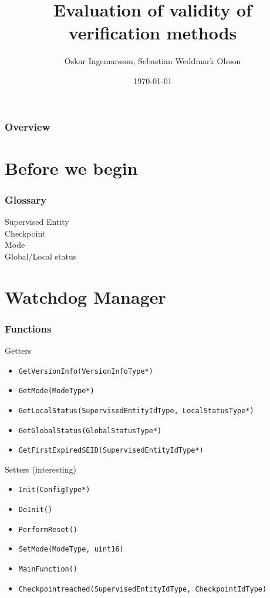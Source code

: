 \documentclass{beamer}
\title{Evaluation of validity of verification methods}
\author{Oskar Ingemarsson, Sebastian Weddmark Olsson}
\institute{Chalmers University of Technology, Mecel AB}
\date{\today}
\begin{document}
\begin{frame}
  \titlepage
\end{frame}

\begin{frame}
  \frametitle{Overview}
  \tableofcontents
\end{frame}

\section{Before we begin}

\begin{frame}
  \frametitle{Glossary}
  \begin{description}
    \item[Supervised Entity]
    \item[Checkpoint]
    \item[Mode]
    \item[Global/Local status]
  \end{description}
\end{frame}


\section{Watchdog Manager}
\begin{frame}[fragile]
  \frametitle{Functions}
  \begin{block}{Getters}
    \begin{itemize}
      \item \lstinline!GetVersionInfo(VersionInfoType*)!
      \item \lstinline!GetMode(ModeType*)!
      \item \lstinline!GetLocalStatus(SupervisedEntityIdType, LocalStatusType*)!
      \item \lstinline!GetGlobalStatus(GlobalStatusType*)!
      \item \lstinline!GetFirstExpiredSEID(SupervisedEntityIdType*)!
    \end{itemize}
  \end{block}

  \begin{block}{Setters (interesting)}
    \begin{itemize}
      \item \lstinline!Init(ConfigType*)!
      \item \lstinline!DeInit()!
      \item \lstinline!PerformReset()!
      \item \lstinline!SetMode(ModeType, uint16)!
      \item \lstinline!MainFunction()!
      \item \lstinline!Checkpointreached(SupervisedEntityIdType, CheckpointIdType)!
    \end{itemize}
  \end{block}
\end{frame}
\end{document}
